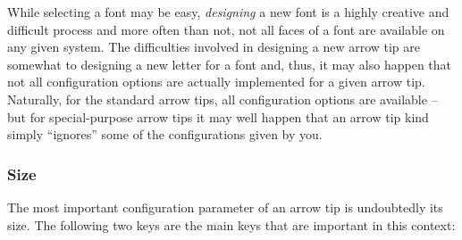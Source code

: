 While selecting a font may be easy, \emph{designing} a new font is a
highly creative and difficult process and more often than not, not all
faces of a font are available on any given system. The difficulties
involved in designing a new arrow tip are somewhat to designing a new
letter for a font and, thus, it may also happen that not all
configuration options are actually implemented for a given arrow
tip. Naturally, for the standard arrow tips, all configuration options
are available -- but for special-purpose arrow tips it may well happen
that an arrow tip kind simply ``ignores'' some of the configurations
given by you.


\subsubsection{Size}

The most important configuration parameter of an arrow tip is
undoubtedly its size. The following two keys are the main keys that
are important in this context:

